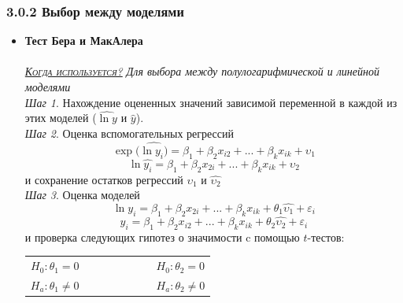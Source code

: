 \documentclass[a0,final]{a0poster}
\begin{document}
\begin{multicols}{4}
\subsubsection*{3.0.2 Выбор между моделями}
\begin{itemize}
\item \textbf{Тест Бера и МакАлера}\\
\\
\underline{\textsc{\textit{Когда используется?}}} \textit{Для выбора между полулогарифмической и линейной моделями}\\
\textit{Шаг 1}. Нахождение оцененных значений зависимой переменной в каждой из этих моделей ($\hat{\ln{y}}$ и $\hat{y}$).\\
\textit{Шаг 2}. Оценка вспомогательных регрессий
\[\exp{(\hat{\ln{y_i})}=\beta_1 + \beta_2x_{i2}+...+\beta_kx_{ik}+\upsilon_{1}}\]
\[\ln{\hat{y_i}}=\beta_1 + \beta_2x_{2i}+...+\beta_kx_{ik}+\upsilon_{2}\]
и сохранение остатков регрессий $\hat{\upsilon_1}$ и $\hat{\upsilon_2}$\\
\textit{Шаг 3}. Оценка моделей
\[\ln{y_i} = {\beta}_1 + \beta_2x_{2i}+...+\beta_kx_{ik} + {\theta}_1\hat{\upsilon_1} + \varepsilon_{i}\]
\[y_i ={\beta}_1 + \beta_2x_{i2}+...+\beta_kx_{ik} + {\theta}_2\hat{\upsilon_2} + \varepsilon_{i}\] и проверка следующих гипотез о значимости c помощью $t$-тестов:
\begin{center}
\begin{tabular}{r  l}
$H_0: \theta_1 = 0 \qquad \qquad \qquad$ &$H_0: \theta_2 = 0$ \\
$H_a: \theta_1 \ne 0 \qquad \qquad \qquad$&$H_a: \theta_2 \ne 0$
\end{tabular}
\end{center}


\end{itemize}
\end{multicols}
\end{document}
